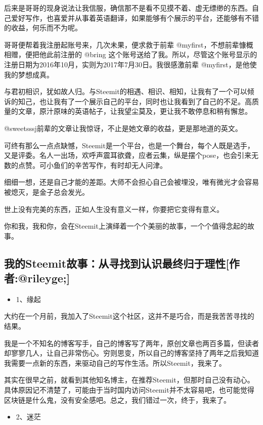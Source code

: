 \documentclass[]{ctexbook}
\providecommand{\tightlist}{%
  \setlength{\itemsep}{0pt}\setlength{\parskip}{0pt}}
\begin{document}
后来是哥哥的现身说法让我信服，确信那不是看不见摸不着、虚无缥缈的东西。自己爱好写作，也喜爱并从事着英语翻译，如果能够有个展示的平台，还能够有不错的收益，何乐而不为呢。

哥哥便帮着我注册起账号来，几次未果，便求救于前辈 @myfirst，不想前辈慷概相赠，便把他此前注册的 @bring 这个账号送给了我。所以，尽管这个账号显示的注册日期为2016年10月，实则为2017年7月30日。我很感激前辈 @myfirst，是他使我的梦想成真。

与君初相识，犹如故人归。与Steemit的相遇、相识、相知，让我有了一个可以倾诉的知己，也让我有了一个展示自己的平台，同时也让我看到了自己的不足。高质量的文章，原汁原味的英语帖子，让我望尘莫及，更让我不敢停息和稍有懈怠。

@sweetsssj前辈的文章让我惊讶，不止是她文章的收益，更是那地道的英文。

可终有那么一点点缺憾，Steemit是一个平台，也是一个舞台，每个人既是选手，又是评委。名人一出场，欢呼声震耳欲聋，应者云集，纵是摆个pose，也会引来无数的点赞。可小鱼们的辛苦写作，有时却无人问津。

细细一想，还是自己才能的差距。大师不会担心自己会被埋没，唯有微光才会容易被熄灭，是金子总会发光。

世上没有完美的东西，正如人生没有意义一样，你要把它变得有意义。

你和我，我和你，会在Steemit上演绎着一个个美丽的故事，一个个值得念起的故事。

\hypertarget{steemitrileyge}{%
\subsection{我的Steemit故事：从寻找到认识最终归于理性{[}作者:@rileyge;{]}}\label{steemitrileyge}}

\begin{itemize}
\tightlist
\item
  1、缘起
\end{itemize}

大约在一个月前，我加入了Steemit这个社区，这并不是巧合，而是我苦苦寻找的结果。

我是一个不知名的博客写手，自己的博客写了两年，原创文章也两百多篇，但读者却寥寥几人，让自己非常伤心。穷则思变，所以自己的博客坚持了两年之后我知道我需要一点新的东西，来驱动自己的写作生活。所以Steemit，我来了。

其实在很早之前，就看到其他知名博主，在推荐Steemit，但那时自己没有动心。具体原因记不清楚了，可能由于当时国内访问Steemit并不太容易吧，也可能觉得区块链是什么鬼，没有安全感吧。总之，我们错过一次，终于，我来了。

\begin{itemize}
\tightlist
\item
  2、迷茫
\end{itemize}
\end{document}
